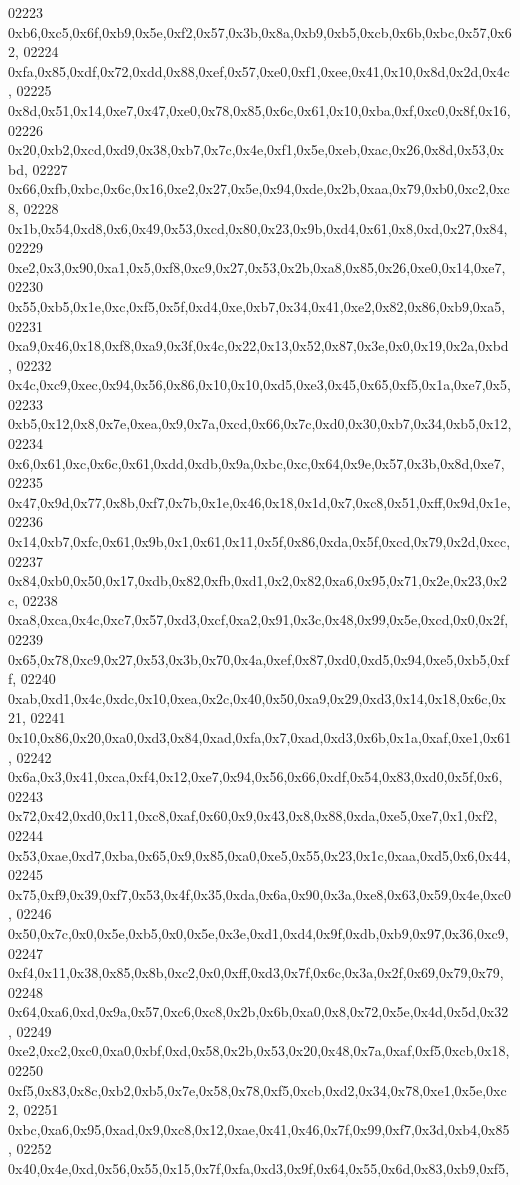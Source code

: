 \begin{DoxyCode}
02223   0xb6,0xc5,0x6f,0xb9,0x5e,0xf2,0x57,0x3b,0x8a,0xb9,0xb5,0xcb,0x6b,0xbc,0x57,0x62,
02224   0xfa,0x85,0xdf,0x72,0xdd,0x88,0xef,0x57,0xe0,0xf1,0xee,0x41,0x10,0x8d,0x2d,0x4c,
02225   0x8d,0x51,0x14,0xe7,0x47,0xe0,0x78,0x85,0x6c,0x61,0x10,0xba,0xf,0xc0,0x8f,0x16,
02226   0x20,0xb2,0xcd,0xd9,0x38,0xb7,0x7c,0x4e,0xf1,0x5e,0xeb,0xac,0x26,0x8d,0x53,0xbd,
02227   0x66,0xfb,0xbc,0x6c,0x16,0xe2,0x27,0x5e,0x94,0xde,0x2b,0xaa,0x79,0xb0,0xc2,0xc8,
02228   0x1b,0x54,0xd8,0x6,0x49,0x53,0xcd,0x80,0x23,0x9b,0xd4,0x61,0x8,0xd,0x27,0x84,
02229   0xe2,0x3,0x90,0xa1,0x5,0xf8,0xc9,0x27,0x53,0x2b,0xa8,0x85,0x26,0xe0,0x14,0xe7,
02230   0x55,0xb5,0x1e,0xc,0xf5,0x5f,0xd4,0xe,0xb7,0x34,0x41,0xe2,0x82,0x86,0xb9,0xa5,
02231   0xa9,0x46,0x18,0xf8,0xa9,0x3f,0x4c,0x22,0x13,0x52,0x87,0x3e,0x0,0x19,0x2a,0xbd,
02232   0x4c,0xc9,0xec,0x94,0x56,0x86,0x10,0x10,0xd5,0xe3,0x45,0x65,0xf5,0x1a,0xe7,0x5,
02233   0xb5,0x12,0x8,0x7e,0xea,0x9,0x7a,0xcd,0x66,0x7c,0xd0,0x30,0xb7,0x34,0xb5,0x12,
02234   0x6,0x61,0xc,0x6c,0x61,0xdd,0xdb,0x9a,0xbc,0xc,0x64,0x9e,0x57,0x3b,0x8d,0xe7,
02235   0x47,0x9d,0x77,0x8b,0xf7,0x7b,0x1e,0x46,0x18,0x1d,0x7,0xc8,0x51,0xff,0x9d,0x1e,
02236   0x14,0xb7,0xfc,0x61,0x9b,0x1,0x61,0x11,0x5f,0x86,0xda,0x5f,0xcd,0x79,0x2d,0xcc,
02237   0x84,0xb0,0x50,0x17,0xdb,0x82,0xfb,0xd1,0x2,0x82,0xa6,0x95,0x71,0x2e,0x23,0x2c,
02238   0xa8,0xca,0x4c,0xc7,0x57,0xd3,0xcf,0xa2,0x91,0x3c,0x48,0x99,0x5e,0xcd,0x0,0x2f,
02239   0x65,0x78,0xc9,0x27,0x53,0x3b,0x70,0x4a,0xef,0x87,0xd0,0xd5,0x94,0xe5,0xb5,0xff,
02240   0xab,0xd1,0x4c,0xdc,0x10,0xea,0x2c,0x40,0x50,0xa9,0x29,0xd3,0x14,0x18,0x6c,0x21,
02241   0x10,0x86,0x20,0xa0,0xd3,0x84,0xad,0xfa,0x7,0xad,0xd3,0x6b,0x1a,0xaf,0xe1,0x61,
02242   0x6a,0x3,0x41,0xca,0xf4,0x12,0xe7,0x94,0x56,0x66,0xdf,0x54,0x83,0xd0,0x5f,0x6,
02243   0x72,0x42,0xd0,0x11,0xc8,0xaf,0x60,0x9,0x43,0x8,0x88,0xda,0xe5,0xe7,0x1,0xf2,
02244   0x53,0xae,0xd7,0xba,0x65,0x9,0x85,0xa0,0xe5,0x55,0x23,0x1c,0xaa,0xd5,0x6,0x44,
02245   0x75,0xf9,0x39,0xf7,0x53,0x4f,0x35,0xda,0x6a,0x90,0x3a,0xe8,0x63,0x59,0x4e,0xc0,
02246   0x50,0x7c,0x0,0x5e,0xb5,0x0,0x5e,0x3e,0xd1,0xd4,0x9f,0xdb,0xb9,0x97,0x36,0xc9,
02247   0xf4,0x11,0x38,0x85,0x8b,0xc2,0x0,0xff,0xd3,0x7f,0x6c,0x3a,0x2f,0x69,0x79,0x79,
02248   0x64,0xa6,0xd,0x9a,0x57,0xc6,0xc8,0x2b,0x6b,0xa0,0x8,0x72,0x5e,0x4d,0x5d,0x32,
02249   0xe2,0xc2,0xc0,0xa0,0xbf,0xd,0x58,0x2b,0x53,0x20,0x48,0x7a,0xaf,0xf5,0xcb,0x18,
02250   0xf5,0x83,0x8c,0xb2,0xb5,0x7e,0x58,0x78,0xf5,0xcb,0xd2,0x34,0x78,0xe1,0x5e,0xc2,
02251   0xbc,0xa6,0x95,0xad,0x9,0xc8,0x12,0xae,0x41,0x46,0x7f,0x99,0xf7,0x3d,0xb4,0x85,
02252   0x40,0x4e,0xd,0x56,0x55,0x15,0x7f,0xfa,0xd3,0x9f,0x64,0x55,0x6d,0x83,0xb9,0xf5,

\end{DoxyCode}
